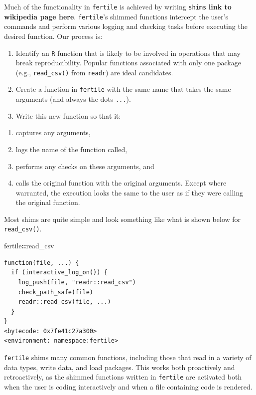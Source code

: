 \documentclass[12pt,twoside]{reedthesis}
\newenvironment{Shaded}{\begin{snugshade}}{\end{snugshade}}
\newcommand{\OperatorTok}[1]{\textcolor[rgb]{0.81,0.36,0.00}{\textbf{#1}}}
\newcommand{\NormalTok}[1]{#1}
\providecommand{\tightlist}{%
  \setlength{\itemsep}{0pt}\setlength{\parskip}{0pt}}
\begin{document}
Much of the functionality in \texttt{fertile} is achieved by writing
\texttt{shims} \textbf{link to wikipedia page here}. \texttt{fertile}'s
shimmed functions intercept the user's commands and perform various
logging and checking tasks before executing the desired function. Our
process is:
\begin{enumerate}
\def\labelenumi{\arabic{enumi}.}
\item
  Identify an \texttt{R} function that is likely to be involved in
  operations that may break reproducibility. Popular functions
  associated with only one package (e.g., \texttt{read\_csv()} from
  \texttt{readr}) are ideal candidates.
\item
  Create a function in \texttt{fertile} with the same name that takes
  the same arguments (and always the dots \texttt{...}).
\item
  Write this new function so that it:
\end{enumerate}
\begin{enumerate}
\def\labelenumi{\alph{enumi})}
\tightlist
\item
  captures any arguments,
\item
  logs the name of the function called,
\item
  performs any checks on these arguments, and
\item
  calls the original function with the original arguments. Except where
  warranted, the execution looks the same to the user as if they were
  calling the original function.
\end{enumerate}
Most shims are quite simple and look something like what is shown below
for \texttt{read\_csv()}.

\footnotesize
\begin{Shaded}
\begin{Highlighting}[]
\NormalTok{fertile}\OperatorTok{::}\NormalTok{read_csv}
\end{Highlighting}
\end{Shaded}
\begin{verbatim}
function(file, ...) {
  if (interactive_log_on()) {
    log_push(file, "readr::read_csv")
    check_path_safe(file)
    readr::read_csv(file, ...)
  }
}
<bytecode: 0x7fe41c27a300>
<environment: namespace:fertile>
\end{verbatim}
\normalsize

\texttt{fertile} shims many common functions, including those that read
in a variety of data types, write data, and load packages. This works
both proactively and retroactively, as the shimmed functions written in
\texttt{fertile} are activated both when the user is coding
interactively and when a file containing code is rendered.
\end{document}
